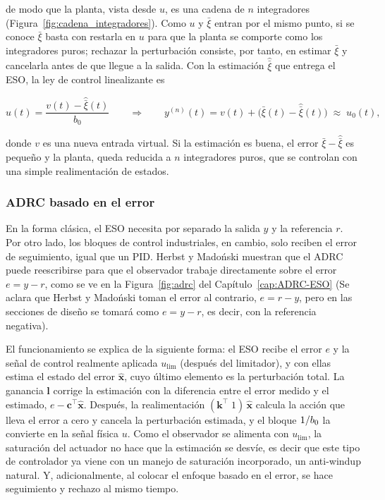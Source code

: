 de modo que la planta, vista desde $u$, es una cadena de $n$ integradores
(Figura~\ref{fig:cadena_integradores}). Como $u$ y $\bar{\xi}$ entran por el mismo
punto, si se conoce $\bar{\xi}$
basta con restarla en $u$ para que la planta se comporte como los integradores
puros; rechazar la perturbación consiste, por
tanto, en estimar $\bar{\xi}$ y cancelarla antes de que llegue a la salida. Con la
estimación $\hat{\bar{\xi}}$ que entrega el ESO, la ley de control linealizante es

\begin{equation}
    u(t) = \frac{v(t) - \hat{\bar{\xi}}(t)}{b_0}
    \qquad\Longrightarrow\qquad
    y^{(n)}(t) = v(t) + \big(\bar{\xi}(t) - \hat{\bar{\xi}}(t)\big) \;\approx\; u_0(t) ,
    \label{eq:intro_linealizante}
\end{equation}

donde $v$ es una nueva entrada virtual. Si la estimación es buena, el error
$\bar{\xi}-\hat{\bar{\xi}}$ es pequeño y la planta, queda reducida a
$n$ integradores puros, que se controlan con una simple realimentación de
estados.

\subsubsection*{ADRC basado en el error}

En la forma clásica, el ESO necesita por separado la salida $y$ y la
referencia $r$. Por otro lado, los bloques de control industriales, en cambio, solo
reciben el error de seguimiento, igual que un PID. Herbst y Madoński
\cite{herbst2024adrc} muestran que el ADRC puede reescribirse para que el
observador trabaje directamente sobre el error $e = y - r$, como se ve en la
Figura~\ref{fig:adrc} del Capítulo~\ref{cap:ADRC-ESO} (Se aclara que Herbst y Madoński toman el error al contrario, $e = r - y$, pero en las secciones de diseño se tomará como $e = y - r$, es decir, con la referencia negativa).

El funcionamiento se explica de la siguiente forma: el ESO recibe el error $e$ y la señal de control
realmente aplicada $u_{\text{lim}}$ (después del limitador), y con ellas
estima el estado del error $\hat{\boldsymbol{x}}$, cuyo último elemento es la
perturbación total. La ganancia $\boldsymbol{l}$ corrige la estimación con la
diferencia entre el error medido y el estimado, $e - \boldsymbol{c}^{\top}
\hat{\boldsymbol{x}}$. Después, la realimentación
$(\boldsymbol{k}^{\top}\;1)\,\hat{\boldsymbol{x}}$ calcula la acción que lleva
el error a cero y cancela la perturbación estimada, y el bloque $1/b_{0}$ la
convierte en la señal física $u$. Como el observador se alimenta con
$u_{\text{lim}}$, la saturación del actuador no hace que la estimación se
desvíe, es decir que este tipo de controlador ya viene con un manejo de saturación incorporado, un anti-windup natural. Y, adicionalmente, al colocar el enfoque
basado en el error, se hace seguimiento y rechazo al mismo tiempo. 

